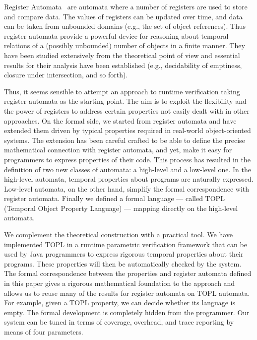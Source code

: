 \documentclass[9pt, preprint]{sigplanconf} %
\theoremstyle{definition}
\theoremstyle{remark}
\begin{document}
Register Automata~\cite{dblp:conf/focs/kaminskif90} are automata where
a number of registers are used to store and compare data. The values
of registers can be updated over time, and data can be taken from unbounded domains (e.g., the set of object references). Thus register automata provide a powerful device for reasoning about temporal 
relations of a (possibly unbounded) number of objects in a finite manner. They have been studied extensively from the theoretical point of
view and essential results for their analysis have been established (e.g., decidability of emptiness, closure under intersection, and so forth).

Thus, it seems sensible to attempt an approach to runtime verification
taking register automata as the starting point. The aim is to
exploit the flexibility and the power of registers to
address certain properties not easily dealt with in other approaches.
On the formal side, we started from register automata and have extended them driven by typical properties required in real-world object-oriented systems.
The extension has been careful crafted to be able to define the precise mathematical connection with register automata, and yet,
make it easy for programmers to express properties of their code. This process has resulted in the definition of two new classes of 
automata: a high-level and a low-level one. In the high-level automata, temporal properties about programs are naturally expressed. Low-level automata, 
on the other hand, simplify the formal correspondence with  register automata. 
Finally we defined a formal language --- called TOPL (Temporal Object Property Language) --- mapping directly on the 
high-level automata.

We complement the theoretical construction with a practical tool.
We have implemented TOPL  in a runtime parametric verification framework that can be used by Java programmers to express rigorous temporal 
properties about their programs. These properties will then be automatically checked by the system.
The formal correspondence between the properties and register automata
defined in this paper gives a rigorous mathematical foundation to
the approach and allows us to reuse many of the results for register automata on TOPL automata. For example, given a TOPL property, we can decide whether its language is empty.  The formal development is completely hidden from 
the programmer.  
Our system can be tuned  in terms of coverage,  overhead, and trace reporting by means of  four parameters. 
\end{document}
